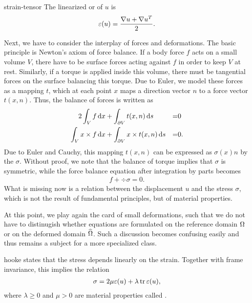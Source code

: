 \begin{Definition}{strain-tensor}
  The linearized  or 
  of $u$ is
  \begin{gather}
    \varepsilon(u) = \frac{\nabla u + \nabla u^T}2.
  \end{gather}
\end{Definition}

\begin{intro}
  Next, we have to consider the interplay of forces and
  deformations. The basic principle is Newton's axiom of force
  balance. If a body force $f$ acts on a small volume $V$, there have
  to be surface forces acting against $f$ in order to keep $V$ at
  rest. Similarly, if a torque is applied inside this volume, there
  must be tangential forces on the surface balancing this torque. Due
  to Euler, we model these forces as a mapping $t$, which at each
  point $x$ maps a direction vector $n$ to a force vector
  $t(x,n)$. Thus, the balance of forces is written as
  \begin{alignat*}2
    \int_V f \dx &+ \int_{\d V} t(x,n) \ds &=&0\\
    \int_V x\times f \dx &+ \int_{\d V} x\times t(x,n) \ds &=&0.
  \end{alignat*}
  Due to Euler and Cauchy, this mapping $t(x,n)$ can be expressed as
  $\sigma(x)n$ by the  $\sigma$. Without proof,
  we note that the balance of torque implies that $\sigma$ is
  symmetric, while the force balance equation after integration by
  parts becomes
  \begin{gather}
    \label{eq:mixedintro:3}
    f + \div \sigma = 0.
  \end{gather}
  What is missing now is a relation between the displacement $u$ and
  the stress $\sigma$, which is not the result of fundamental
  principles, but of material properties.
\end{intro}

\begin{remark}
  At this point, we play again the card of small deformations, such
  that we do not have to distinugish whether equations are formulated
  on the reference domain $\Omega$ or on the deformed domain
  $\widehat{\Omega}$. Such a discussion becomes confusing easily and
  thus remains a subject for a more specialized class.
\end{remark}

\begin{Definition}{hooke}
   states that the stress depends linearly on the
  strain. Together with frame invariance, this implies the relation
  \begin{gather}
    \label{eq:mixedintro:4}
    \sigma = 2\mu \varepsilon(u) + \lambda \operatorname{tr} \varepsilon(u),
  \end{gather}
  where $\lambda\ge 0$ and $\mu> 0$ are material properties called
  .
\end{Definition}

